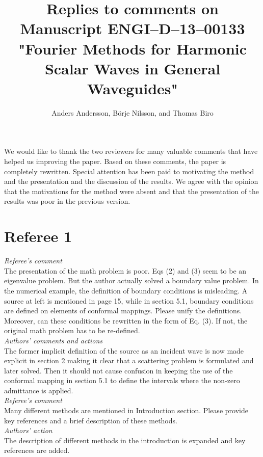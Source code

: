 \documentclass[a4paper,12pt]{article}%
\begin{document}
\date{} \title{Replies to comments on\\Manuscript
  ENGI--D--13--00133\\"Fourier Methods for Harmonic Scalar Waves in
  General Waveguides"} \author{Anders Andersson, B\"orje Nilsson, and
  Thomas Biro}
\maketitle

We would like to thank the two reviewers for many valuable comments
that have helped us improving the paper. Based on these comments, the
paper is completely rewritten. Special attention has been paid to
motivating the method and the presentation and the discussion of the
results. We agree with the opinion that the motivations for the method
were absent and that the presentation of the results was poor in the
previous version.
\section*{Referee 1}


{\it Referee's comment}\\
The presentation of the math problem is poor. Eqs (2) and (3) seem to
be an eigenvalue problem. But the author actually solved a boundary
value problem. In the numerical example, the definition of boundary
conditions is misleading. A source at left is mentioned in page 15,
while in section 5.1, boundary conditions are defined on elements of
conformal mappings. Please unify the definitions. Moreover, can these
conditions be rewritten in the form of Eq. (3). If not, the original
math problem has to be re-defined.\\ 
{\it Authors' comments and actions}\\
The former implicit definition of the source as an incident wave is
now made explicit in section 2 making it clear that a scattering
problem is formulated and later solved. Then it should not cause
confusion in keeping the use of the conformal mapping in section 5.1
to define the intervals where the non-zero admittance is applied.\\ 
\newline
{\it Referee's comment}\\
Many different methods are mentioned in Introduction section. Please
provide key references and a brief description of these methods.\\ 
{\it Authors' action}\\
The description of different methods in the introduction is expanded
and key references are added.
\end{document}
